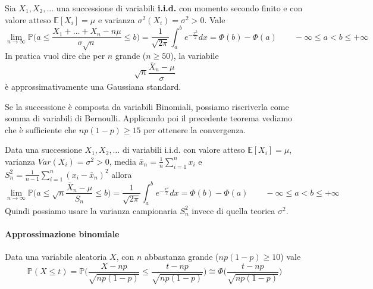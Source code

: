 \begin{theorem}
	Sia $X_1, X_2, \ldots$ una successione di variabili \textbf{i.i.d.} con momento secondo finito e con valore atteso $\mathbb{E}[X_i] = \mu$ e varianza $\sigma^2(X_i)=\sigma^2 > 0$. Vale
	\begin{equation}
		\lim_{n \to \infty} \mathbb{P} \bigg(a \leq \frac{X_1 + \ldots + X_n - n\mu}{\sigma \sqrt{n}} \leq b\bigg) = \frac{1}{\sqrt{2 \pi}} \int_{a}^{b}e^{-\frac{x^2}{2}}dx = \Phi(b) - \Phi(a) \quad\quad -\infty \leq a < b \leq + \infty
	\end{equation}
	In pratica vuol dire che per $n$ grande ($n \geq 50$), la variabile
	\begin{equation}
		\label{eq:tcl}
		\sqrt{n}\frac{\bar{X}_n - \mu}{\sigma}
	\end{equation}
	è approssimativamente una Gaussiana standard.
\end{theorem}

\begin{observation}
	Se la successione è composta da variabili Binomiali, possiamo riscriverla come somma di variabili di Bernoulli. Applicando poi il precedente teorema vediamo che è sufficiente che $np(1-p) \geq 15$ per ottenere la convergenza.
\end{observation}

\begin{proposition}
	Data una successione $X_1, X_2, \ldots$ di variabili i.i.d. con valore atteso $\mathbb{E}[X_i] = \mu$, varianza $Var(X_i)=\sigma^2 > 0$, media $\bar{x}_n = \frac{1}{n}\sum_{i=1}^{n}x_i$ e $S^2_n=\frac{1}{n-1}\sum_{i=1}^{n}(x_i-\bar{x}_n)^2$ allora
	\begin{equation}
		\lim_{n \to \infty}\mathbb{P} \bigg(a \leq \sqrt{n}\frac{\bar{X}_n - \mu}{S_n} \leq b\bigg) = \frac{1}{\sqrt{2 \pi}} \int_{a}^{b}e^{-\frac{x^2}{2}}dx = \Phi(b) - \Phi(a) \quad\quad -\infty \leq a < b \leq + \infty
	\end{equation}
	Quindi possiamo usare la varianza campionaria $S^2_n$ invece di quella teorica $\sigma^2$.
\end{proposition}

\paragraph{Approssimazione binomiale}
\begin{definition}
	Data una variabile aleatoria $X$, con $n$ abbastanza grande ($np(1-p)\geq10$) vale
	\begin{equation}
		\mathbb{P}(X \leq t)=\mathbb{P}\bigg(\frac{X - np}{\sqrt{np(1-p)}} \leq \frac{t-np}{\sqrt{np(1-p)}}\bigg) \cong \Phi\bigg(\frac{t-np}{\sqrt{np(1-p)}}\bigg)
	\end{equation}
\end{definition}